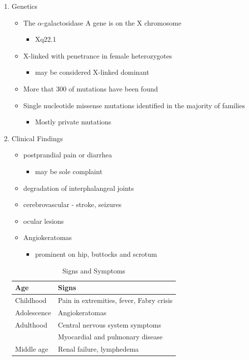 \documentclass{scrartcl}
\begin{document}
\begin{enumerate}
\item Genetics
\label{sec:orgf14464b}
\begin{itemize}
\item The \(\alpha\)-galactosidase A gene is on the X chromosome
\begin{itemize}
\item Xq22.1
\end{itemize}
\item X-linked with penetrance in female heterozygotes
\begin{itemize}
\item may be considered X-linked dominant
\end{itemize}
\item More that 300 of mutations have been found
\item Single nucleotide missense mutations identified in the majority of families
\begin{itemize}
\item Mostly private mutations
\end{itemize}
\end{itemize}

\item Clinical Findings
\label{sec:org4f5cac2}

\begin{itemize}
\item postprandial pain or diarrhea
\begin{itemize}
\item may be sole complaint
\end{itemize}
\item degradation of interphalangeal joints
\item cerebrovascular - stroke, seizures
\item ocular lesions
\item Angiokeratomas
\begin{itemize}
\item prominent on hip, buttocks and scrotum
\end{itemize}
\end{itemize}

\begin{table}[htbp]
\caption{\label{tab:orgc4a8a67}
Signs and Symptoms}
\centering
\begin{tabular}{ll}
Age & Signs\\
\hline
Childhood & Pain in extremities, fever, Fabry crisis \footnotemark\\
Adolescence & Angiokeratomas\\
Adulthood & Central nervous system symptoms\\
 & Myocardial and pulmonary disease\\
Middle age & Renal failure, lymphedema\\
\end{tabular}
\end{table}
\end{enumerate}
\end{document}
